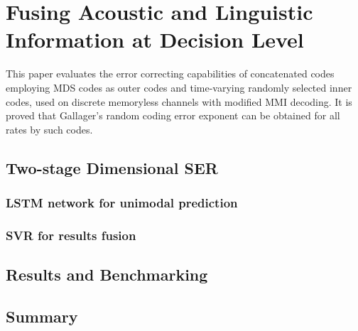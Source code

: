 \chapter{Fusing Acoustic and Linguistic Information at Decision Level}
This paper evaluates the error 
correcting capabilities of concatenated codes 
employing MDS codes as outer codes and
time-varying randomly selected inner codes,
used on discrete memoryless channels with modified MMI
decoding. It is proved that 
Gallager's random coding error exponent
can be obtained for all rates by such codes.
\section{Two-stage Dimensional SER}
\subsection{LSTM network for unimodal prediction}
\subsection{SVR for results fusion}
\section{Results and Benchmarking}
\section{Summary}
